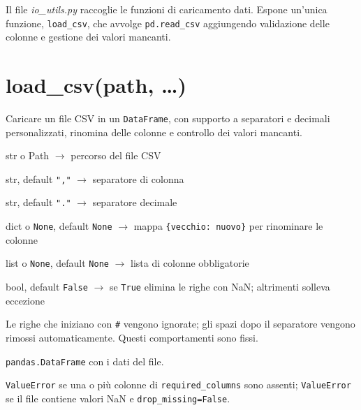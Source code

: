 
Il file \textit{io\_utils.py} raccoglie le funzioni di caricamento dati. Espone un'unica funzione, \texttt{load\_csv}, che avvolge \texttt{pd.read\_csv} aggiungendo validazione delle colonne e gestione dei valori mancanti.

\section{\texorpdfstring{load\_csv(path, \ldots)}{load\_csv(path, ...)}}
\label{sec:load-csv}
\begin{apidesc}
  \item[\textbf{Scopo}]
    Caricare un file CSV in un \texttt{DataFrame}, con supporto a separatori e decimali personalizzati, rinomina delle colonne e controllo dei valori mancanti.
  \item[\textbf{Parametri}]\hfill
    \begin{description}[font=\normalfont\ttfamily\bfseries, labelwidth=1.5em, leftmargin=2em, itemsep=1pt, parsep=0pt, topsep=1pt]
      \item[path] str o Path $\to$ percorso del file CSV
      \item[sep] str, default \texttt{","} $\to$ separatore di colonna
      \item[decimal] str, default \texttt{"."} $\to$ separatore decimale
      \item[rename\_columns] dict o \texttt{None}, default \texttt{None} $\to$ mappa \texttt{\{vecchio: nuovo\}} per rinominare le colonne
      \item[required\_columns] list o \texttt{None}, default \texttt{None} $\to$ lista di colonne obbligatorie
      \item[drop\_missing] bool, default \texttt{False} $\to$ se \texttt{True} elimina le righe con NaN; altrimenti solleva eccezione
    \end{description}
  \item[\textbf{Note}]
    Le righe che iniziano con \texttt{\#} vengono ignorate; gli spazi dopo il separatore vengono rimossi automaticamente. Questi comportamenti sono fissi.
  \item[\textbf{Restituisce}]
    \texttt{pandas.DataFrame} con i dati del file.
  \item[\textbf{Eccezioni}]
    \texttt{ValueError} se una o più colonne di \texttt{required\_columns} sono assenti;
    \texttt{ValueError} se il file contiene valori NaN e \texttt{drop\_missing=False}.
\end{apidesc}
\vspace{-15pt}
